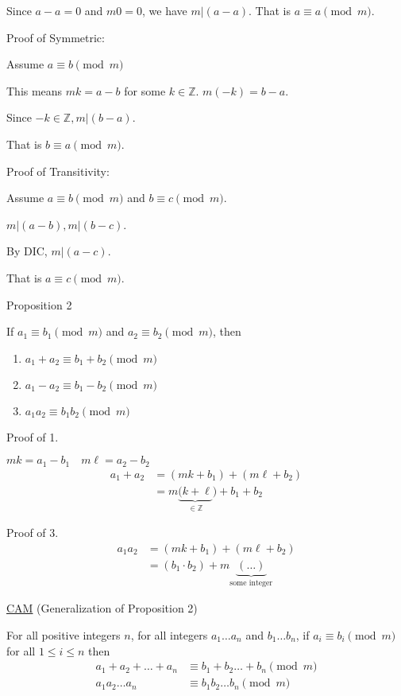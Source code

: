 \documentclass{article}
\begin{document}
Since $a - a = 0$ and $m0 = 0$, we have $m \vert (a-a)$. That is $a \equiv a \pmod{m}$.

Proof of Symmetric:

Assume $a \equiv b \pmod{m}$

This means $mk = a-b$ for some $k \in \mathbb{Z}$. $m(-k) = b-a$. 

Since $-k \in \mathbb{Z}, m \vert (b-a)$. 

That is $b \equiv a \pmod{m}$. 

Proof of Transitivity:

Assume $a \equiv b \pmod{m}$ and $b \equiv c \pmod{m}$. 

$m \vert (a-b), m \vert (b-c)$. 

By DIC, $m \vert (a-c)$. 

That is $a \equiv c \pmod{m}$.

Proposition 2

If $a_1 \equiv b_1 \pmod{m}$ and $a_2 \equiv b_2 \pmod{m}$, then
\begin{enumerate}
    \item $a_1 + a_2 \equiv b_1 + b_2 \pmod{m}$
    \item $a_1 - a_2 \equiv b_1 - b_2 \pmod{m}$
    \item $a_1a_2 \equiv b_1b_2 \pmod{m}$
\end{enumerate}

Proof of 1.

$mk = a_1 - b_1 \quad m\ell = a_2 - b_2$
\begin{align*}
    a_1 + a_2 &= (mk + b_1) + (m\ell + b_2) \\
    &= m \underbrace{(k+\ell}_{\in \mathbb{Z}}) + b_1 + b_2
\end{align*}

Proof of 3. 
\begin{align*}
    a_1a_2 &= (mk + b_1) + (m\ell + b_2) \\
    &= (b_1 \cdot b_2) + m\underbrace{(\ldots)}_{\text{some integer}}
\end{align*}

\underline{CAM} (Generalization of Proposition 2)

For all positive integers $n$, for all integers $a_1 \ldots a_n$ and $b_1 \ldots b_n$, if $a_i \equiv b_i \pmod{m}$ for all $1 \le i \le n$ then 
\begin{align*}
    a_1 + a_2 + \ldots + a_n &\equiv b_1 + b_2 \ldots + b_n \pmod{m} \\
    a_1 a_2 \ldots a_n &\equiv b_1b_2 \ldots b_n \pmod{m}
\end{align*}
\end{document}
